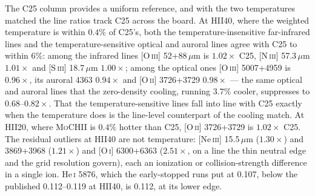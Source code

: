\documentclass[twocolumn,linenumbers]{aastex702}
\newcommand{\MoCHII}{\textsc{MoCHII}}
\newcommand{\HeI}{He\,\textsc{i}}
\begin{document}
The C25 column provides a uniform reference, and with the two temperatures
matched the line
ratios track C25 across the board.  At HII40, where the weighted temperature
is within $0.4\%$ of C25's, both the temperature-insensitive far-infrared lines and the
temperature-sensitive optical and auroral lines agree with C25 to within
$6\%$: among the infrared lines [O\,\textsc{iii}] 52+88\,$\mu$m is
$1.02\times$ C25, [N\,\textsc{iii}] 57.3\,$\mu$m $1.01\times$ and
[S\,\textsc{iii}] 18.7\,$\mu$m $1.00\times$; among the optical ones
[O\,\textsc{iii}] 5007+4959 is $0.96\times$, its auroral 4363 $0.94\times$
and [O\,\textsc{ii}] 3726+3729 $0.98\times$ --- the same optical and auroral
lines that the zero-density cooling, running $3.7\%$ cooler, suppresses
to $0.68$--$0.82\times$.  That the temperature-sensitive lines fall into
line with C25 exactly when the temperature does is the line-level
counterpart of the cooling match.  At HII20, where \MoCHII{} is $0.4\%$
hotter than C25, [O\,\textsc{ii}] 3726+3729 is $1.02\times$ C25.  The
residual outliers at HII40 are not temperature: [Ne\,\textsc{iii}]
15.5\,$\mu$m ($1.30\times$) and 3869+3968 ($1.21\times$) and
[O\,\textsc{i}] 6300+6363 ($2.51\times$, on a line the thin neutral edge and
the grid resolution govern), each an ionization or collision-strength
difference in a single ion.  \HeI{} 5876, which the early-stopped runs put
at 0.107, below the published 0.112--0.119 at HII40, is 0.112, at its lower edge.
\end{document}
